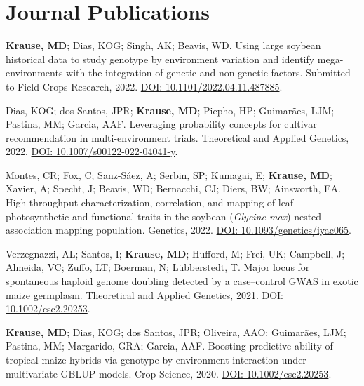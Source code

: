 \documentclass[]{mdkrause_cv_openfont}
\begin{document}
\begin{minipage}[t]{1\textwidth} 


\section{Journal Publications} 

\sectionsep
\textbf{Krause, MD}; Dias, KOG; Singh, AK; Beavis, WD. Using large soybean historical data to study genotype by environment variation and identify mega-environments with the integration of genetic and non-genetic factors. Submitted to Field Crops Research, 2022. \href{https://www.biorxiv.org/content/10.1101/2022.04.11.487885v3.abstract}{DOI: 10.1101/2022.04.11.487885}. \ExternalLink

\sectionsep
Dias, KOG; dos Santos, JPR; \textbf{Krause, MD}; Piepho, HP; Guimarães, LJM; Pastina, MM; Garcia, AAF. Leveraging probability concepts for cultivar recommendation in multi-environment trials. Theoretical and Applied Genetics, 2022. \href{https://link.springer.com/article/10.1007/s00122-022-04041-y}{DOI: 10.1007/s00122-022-04041-y}. \ExternalLink 

\sectionsep
Montes, CR; Fox, C; Sanz-Sáez, A; Serbin, SP; Kumagai, E; \textbf{Krause, MD}; Xavier, A; Specht, J; Beavis, WD; Bernacchi, CJ; Diers, BW; Ainsworth, EA. High-throughput characterization, correlation, and mapping of leaf photosynthetic and functional traits in the soybean (\textit{Glycine max}) nested association mapping population. Genetics, 2022. \href{https://academic.oup.com/genetics/advance-article/doi/10.1093/genetics/iyac065/6572345?login=true}{DOI: 10.1093/genetics/iyac065}. \ExternalLink

\sectionsep
Verzegnazzi, AL; Santos, I; \textbf{Krause, MD}; Hufford, M; Frei, UK; Campbell, J; Almeida, VC; Zuffo, LT; Boerman, N; Lübberstedt, T. Major locus for spontaneous haploid genome doubling detected by a case–control GWAS in exotic maize germplasm. Theoretical and Applied Genetics, 2021. \href{https://link.springer.com/article/10.1007/s00122-021-03780-8}{DOI: 10.1002/csc2.20253}. \ExternalLink 

\sectionsep
\textbf{Krause, MD}; Dias, KOG; dos Santos, JPR; Oliveira, AAO; Guimarães, LJM; Pastina, MM; Margarido, GRA; Garcia, AAF. Boosting predictive ability of tropical maize hybrids via genotype by environment interaction under multivariate GBLUP models. Crop Science, 2020. \href{https://acsess.onlinelibrary.wiley.com/doi/full/10.1002/csc2.20253}{DOI: 10.1002/csc2.20253}. \ExternalLink 


\end{minipage}
\end{document}
